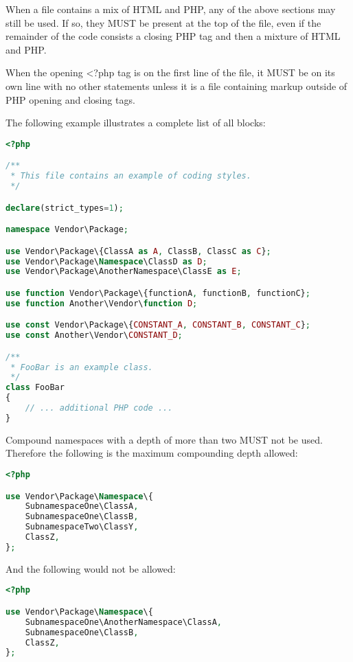 When a file contains a mix of HTML and PHP, any of the above sections may still be used. If so, they MUST be present at the top of the file, even if the remainder of the code consists a closing PHP tag and then a mixture of HTML and PHP.

When the opening <?php tag is on the first line of the file, it MUST be on its own line with no other statements unless it is a file containing markup outside of PHP opening and closing tags.

The following example illustrates a complete list of all blocks:



\begin{lstlisting}[language=PHP]
<?php

/**
 * This file contains an example of coding styles.
 */

declare(strict_types=1);

namespace Vendor\Package;

use Vendor\Package\{ClassA as A, ClassB, ClassC as C};
use Vendor\Package\Namespace\ClassD as D;
use Vendor\Package\AnotherNamespace\ClassE as E;

use function Vendor\Package\{functionA, functionB, functionC};
use function Another\Vendor\function D;

use const Vendor\Package\{CONSTANT_A, CONSTANT_B, CONSTANT_C};
use const Another\Vendor\CONSTANT_D;

/**
 * FooBar is an example class.
 */
class FooBar
{
    // ... additional PHP code ...
}
\end{lstlisting}


Compound namespaces with a depth of more than two MUST not be used. Therefore the following is the maximum compounding depth allowed:





\begin{lstlisting}[language=PHP]
<?php

use Vendor\Package\Namespace\{
    SubnamespaceOne\ClassA,
    SubnamespaceOne\ClassB,
    SubnamespaceTwo\ClassY,
    ClassZ,
};
\end{lstlisting}



And the following would not be allowed:




\begin{lstlisting}[language=PHP]
<?php

use Vendor\Package\Namespace\{
    SubnamespaceOne\AnotherNamespace\ClassA,
    SubnamespaceOne\ClassB,
    ClassZ,
};
\end{lstlisting}


